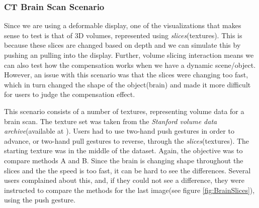 \documentclass[]{article}
\begin{document}
\subsubsection{CT Brain Scan Scenario}

Since we are using a deformable display, one of the visualizations that makes sense to test is that of 3D volumes, represented using \textit{slices}(textures). This is because these slices are changed based on depth and we can simulate this by pushing an pulling into the display. Further, volume slicing interaction means we can also test how the compensation works when we have a dynamic scene/object. However, an issue with this scenario was that the slices were changing too fast, which in turn changed the shape of the object(brain) and made it more difficult for users to judge the compensation effect.

This scenario consists of a number of textures, representing volume data for a brain scan. The texture set was taken from the \textit{Stanford volume data archive}(available at \cite{levoy2001}). Users had to use two-hand push gestures in order to advance, or two-hand pull gestures to reverse, through the \textit{slices}(textures). The starting texture was in the middle of the dataset. Again, the objective was to compare methods A and B. Since the brain is changing shape throughout the slices and the the speed is too fast, it can be hard to see the differences. Several users complained about this, and, if they could not see a difference, they were instructed to compare the methods for the last image(see figure \ref{fig:BrainSlices}), using the push gesture.
\end{document}
